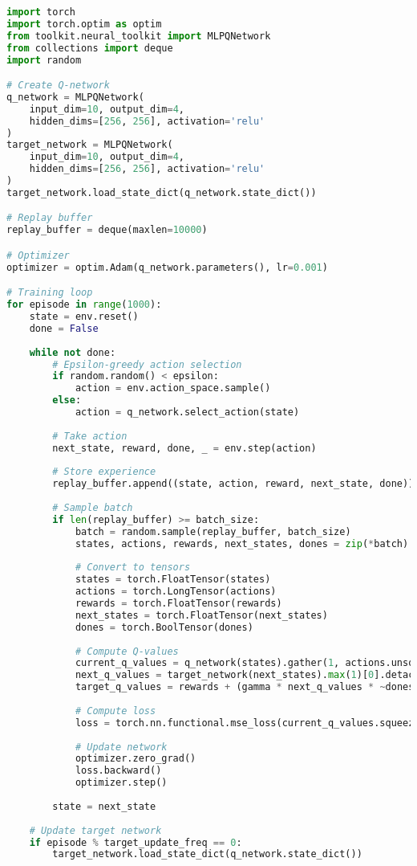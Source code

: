 \begin{lstlisting}[language=python, caption=DQN Training Example]
import torch
import torch.optim as optim
from toolkit.neural_toolkit import MLPQNetwork
from collections import deque
import random

# Create Q-network
q_network = MLPQNetwork(
    input_dim=10, output_dim=4,
    hidden_dims=[256, 256], activation='relu'
)
target_network = MLPQNetwork(
    input_dim=10, output_dim=4,
    hidden_dims=[256, 256], activation='relu'
)
target_network.load_state_dict(q_network.state_dict())

# Replay buffer
replay_buffer = deque(maxlen=10000)

# Optimizer
optimizer = optim.Adam(q_network.parameters(), lr=0.001)

# Training loop
for episode in range(1000):
    state = env.reset()
    done = False
    
    while not done:
        # Epsilon-greedy action selection
        if random.random() < epsilon:
            action = env.action_space.sample()
        else:
            action = q_network.select_action(state)
        
        # Take action
        next_state, reward, done, _ = env.step(action)
        
        # Store experience
        replay_buffer.append((state, action, reward, next_state, done))
        
        # Sample batch
        if len(replay_buffer) >= batch_size:
            batch = random.sample(replay_buffer, batch_size)
            states, actions, rewards, next_states, dones = zip(*batch)
            
            # Convert to tensors
            states = torch.FloatTensor(states)
            actions = torch.LongTensor(actions)
            rewards = torch.FloatTensor(rewards)
            next_states = torch.FloatTensor(next_states)
            dones = torch.BoolTensor(dones)
            
            # Compute Q-values
            current_q_values = q_network(states).gather(1, actions.unsqueeze(1))
            next_q_values = target_network(next_states).max(1)[0].detach()
            target_q_values = rewards + (gamma * next_q_values * ~dones)
            
            # Compute loss
            loss = torch.nn.functional.mse_loss(current_q_values.squeeze(), target_q_values)
            
            # Update network
            optimizer.zero_grad()
            loss.backward()
            optimizer.step()
        
        state = next_state
    
    # Update target network
    if episode % target_update_freq == 0:
        target_network.load_state_dict(q_network.state_dict())
\end{lstlisting}

